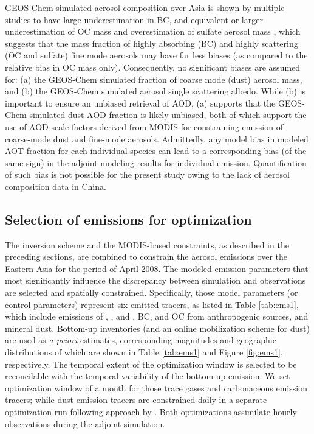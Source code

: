  GEOS-Chem simulated aerosol composition over Asia is shown by multiple studies 
 to have large underestimation in BC, and equivalent or larger underestimation 
 of OC mass and overestimation of sulfate aerosol mass \citep{Heald05,Fu12},
 which suggests that the mass fraction of highly absorbing (BC) 
 and highly scattering (OC and sulfate) fine mode aerosols may have far less biases 
 (as compared to the relative bias in OC mass only). 
 Consequently, no significant biases are assumed for: 
 (a) the GEOS-Chem simulated fraction of coarse mode (dust) aerosol mass, 
 and (b) the GEOS-Chem simulated aerosol single scattering albedo. 
 While (b) is important to ensure an unbiased retrieval of AOD, 
 (a) supports that the GEOS-Chem simulated dust AOD fraction is likely unbiased, 
 both of which support the use of AOD scale factors derived from MODIS 
 for constraining emission of coarse-mode dust and fine-mode aerosols. 
 Admittedly, any model bias in modeled AOT fraction for each individual species 
 can lead to a corresponding bias (of the same sign) in the adjoint modeling 
 results for individual emission. 
 Quantification of such bias is not possible for the present study 
 owing to the lack of aerosol composition data in China.


\subsection{Selection of emissions for optimization} \label{subsec:selectems}

 The inversion scheme and the MODIS-based constraints, as described in the preceding sections, 
 are combined to constrain the aerosol emissions over the Eastern Asia 
 for the period of April 2008. 
 The modeled emission parameters that most significantly influence the discrepancy 
 between simulation and observations are selected and spatially constrained. 
 Specifically, those model parameters (or control parameters) represent six emitted tracers, 
 as listed in Table \ref{tab:ems1}, which include emissions of , , and , BC, 
 and OC from anthropogenic sources, and mineral dust. 
 Bottom-up inventories (and an online mobilization scheme for dust) are used as 
 \textit{a priori} estimates, corresponding magnitudes and geographic distributions 
 of which are shown in Table \ref{tab:ems1} and Figure \ref{fig:ems1}, respectively. 
 The temporal extent of the optimization window is selected 
 to be reconcilable with the temporal variability of the bottom-up emission. 
 We set optimization window of a month for those trace gases and carbonaceous emission tracers; 
 while dust emission tracers are constrained daily in a separate optimization run 
 following approach by \citet{Wang12}. 
 Both optimizations assimilate hourly observations during the adjoint simulation. 

